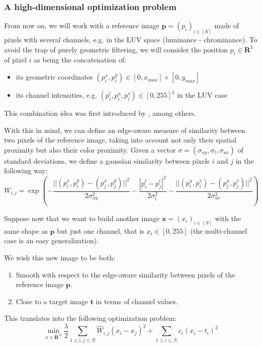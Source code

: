 \documentclass{article}
\begin{document}
\subsubsection{A high-dimensional optimization problem}

From now on, we will work with a reference image $\textbf{p} = (p_i)_{i \in [N]}$ made of pixels with several channels, e.g. in the  LUV space (luminance - chrominance). To avoid the trap of purely geometric filtering, we will consider the position $p_i \in \textbf{R}^5$ of pixel $i$ as being the concatenation of:
\begin{itemize}
    \item its geometric coordinates $(p_i^x, p_i^y) \in [0, x_{max}] \times [0, y_{max}]$
    \item its channel intensities, e.g. $(p_i^l, p_i^u, p_i^v) \in [0, 255]^3$ in the LUV case
\end{itemize}

This combination idea was first introduced by \cite{tomasi_bilateral_1998}, among others.

With this in mind, we can define an edge-aware measure of similarity between two pixels of the reference image, taking into account not only their spatial proximity but also their color proximity. Given a vector $\sigma = (\sigma_{xy}, \sigma_l, \sigma_{uv})$ of standard deviations, we define a gaussian similarity between pixels $i$ and $j$ in the following way:
\begin{equation}
    W_{i, j} = \exp \left(
    - \frac{|| (p_i^x, p_i^y) - (p_j^x, p_j^y) ||^2}{2 \sigma_{xy}^2}
    - \frac{| p_i^l - p_j^l |^2}{2 \sigma_l^2}
    - \frac{|| (p_i^u, p_i^v) - (p_j^u, p_j^v) ||^2}{2 \sigma_{uv}^2}
     \right)
\end{equation}

Suppose now that we want to build another image $\textbf{x} = (x_i)_{i \in [N]}$ with the same shape as $\textbf{p}$ but just one channel, that is $x_i \in [0, 255]$ (the multi-channel case is an easy generalization).

We wish this new image to be both:
\begin{enumerate}
    \item Smooth with respect to the edge-aware similarity between pixels of the reference image $\textbf{p}$.
    \item Close to a target image $\textbf{t}$ in terms of channel values.
\end{enumerate}

This translates into the following optimization problem:
\begin{equation} \label{optim}
    \min_{x \in \textbf{R}^N} \frac{\lambda}{2} \sum_{1 \leq i, j \leq N}{\hat{W}_{i, j} (x_i - x_j)^2} + \sum_{1 \leq i \leq N}{c_i (x_i - t_i)^2}
\end{equation}
\end{document}
